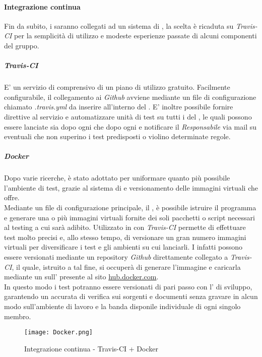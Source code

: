 \documentclass{scalatekids-article}
\begin{document}
\paragraph{Integrazione continua}
Fin da subito, i  saranno collegati ad un sistema di
, la scelta è ricaduta su \textit{Travis-CI} per la
semplicità di utilizzo e modeste esperienze passate di alcuni componenti del
gruppo.
\subparagraph{Travis-CI}
E' un servizio di  comprensivo di un piano di
utilizzo gratuito. Facilmente configurabile, il collegamento ai 
\textit{Github} avviene mediante un file di configurazione chiamato \textit{.travis.yml}
da inserire all'interno del . E' inoltre possibile fornire
direttive al servizio e automatizzare unità di test su tutti i  del
, le quali possono essere lanciate sia dopo ogni 
che dopo ogni  e notificare il \textit{Responsabile} via mail su
eventuali  che non superino i test predisposti o violino
determinate regole.
\subparagraph{Docker}
Dopo varie ricerche,  è stato adottato per uniformare quanto più
possibile l'ambiente di test, grazie al sistema di  e
versionamento delle immagini virtuali che offre.\\ Mediante un file di
configurazione principale, il , è possibile istruire il
programma e generare una o più immagini virtuali fornite dei soli pacchetti o
script necessari al testing a cui sarà adibito. Utilizzato in  con
\textit{Travis-CI} permette di effettuare test molto precisi e, allo stesso
tempo, di versionare un gran numero immagini virtuali per diversificare i test e
gli ambienti su cui lanciarli. I  infatti possono essere
versionati mediante un repository \textit{Github} direttamente collegato a
\textit{Travis-CI}, il quale, istruito a tal fine, si occuperà di generare
l'immagine  e caricarla mediante un  sull'
 presente al sito \url{hub.docker.com}.\\ In questo modo i test
potranno essere versionati di pari passo con l' di sviluppo, garantendo
un accurata  di verifica sui sorgenti e documenti senza gravare in alcun
modo sull'ambiente di lavoro e la banda disponile individuale di ogni singolo
membro.
\begin{figure}[H]
  \centering
  \texttt{[image: Docker.png]}
  \caption{Integrazione continua - Travis-CI + Docker}
\end{figure}
\end{document}
